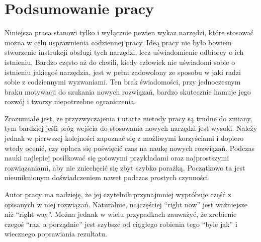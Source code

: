 \chapter{Podsumowanie pracy}

Niniejsza praca stanowi tylko i wyłącznie pewien wykaz narzędzi, które stosować można w celu usprawnienia codziennej pracy. Ideą pracy nie było bowiem stworzenie instrukcji obsługi tych narzędzi, lecz uświadomienie odbiorcy o ich istnieniu. Bardzo często aż do chwili, kiedy człowiek nie uświadomi sobie o istnieniu jakiegoś narzędzia, jest w pełni zadowolony ze sposobu w jaki radzi sobie z codziennymi wyzwaniami. Ten brak świadomości, przy jednoczesnym braku motywacji do szukania nowych rozwiązań, bardzo skutecznie hamuje jego rozwój i tworzy niepotrzebne ograniczenia.

Zrozumiałe jest, że przyzwyczajenia i utarte metody pracy są trudne do zmiany, tym bardziej jeśli próg wejścia do stosowania nowych narzędzi jest wysoki. Należy jednak w pierwszej kolejności zapoznać się z możliwymi korzyściami i dopiero wtedy ocenić, czy opłaca się poświęcić czas na naukę nowych rozwiązań. Podczas nauki najlepiej posiłkować się gotowymi przykładami oraz najprostszymi rozwiązaniami, aby nie zniechęcić się zbyt szybko porażką. Początkowo ta jest nieuniknionym doświadczeniem nawet podczas prostych czynności.

Autor pracy ma nadzieję, że jej czytelnik przynajmniej wypróbuje część z opisanych w niej rozwiązań. Naturalnie, najczęściej \enquote{right now} jest ważniejsze niż \enquote{right way}. Można jednak w wielu przypadkach zauważyć, że zrobienie czegoś \enquote{raz, a porządnie} jest szybsze od ciągłego robienia tego \enquote{byle jak} i wiecznego poprawiania rezultatu.
